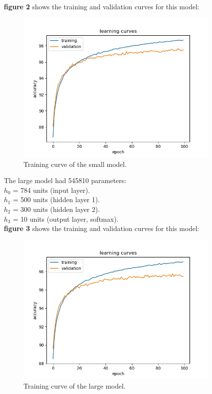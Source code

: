 \documentclass{amsart}
\theoremstyle{definition}
\theoremstyle{remark}
\numberwithin{equation}{section}
\begin{document}
\textbf{figure 2} shows the training and validation curves for this model: \\

\begin{figure}[h]
\includegraphics[width=100mm]{02_accuracy_266610_params}
\caption{Training curve of the small model.}
\label{Figure 2}
\end{figure}

The large model had 545810 parameters: \\

$h_0$ = 784 units (input layer). \\
$h_1$ = 500 units (hidden layer 1). \\
$h_2$ = 300 units (hidden layer 2). \\
$h_3$ = 10 units (output layer, softmax). \\

\textbf{figure 3} shows the training and validation curves for this model: \\

\begin{figure}[h]
\includegraphics[width=100mm]{02_accuracy_545810_params}
\caption{Training curve of the large model.}
\label{Figure 3}
\end{figure}
\end{document}
